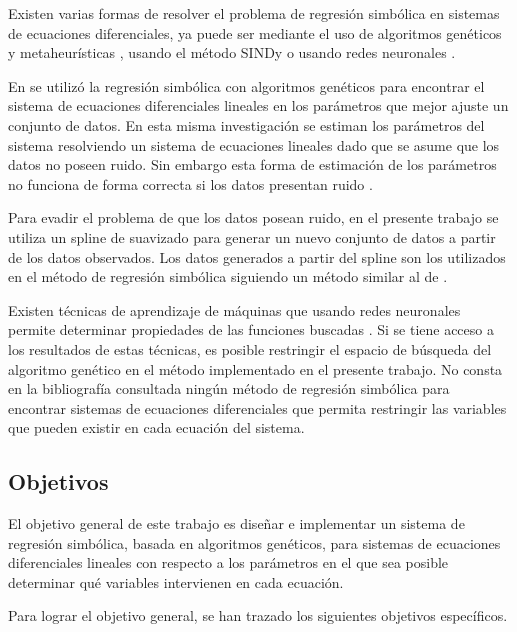 Existen varias formas de resolver el problema de regresión simbólica en sistemas de ecuaciones diferenciales, ya puede ser mediante el uso de algoritmos genéticos y metaheurísticas \cite{koza1994genetic, schmidt2013eureqa}, usando el método SINDy \cite{brunton2016discovering} o usando redes neuronales \cite{udrescu2020ai}.

En \cite{iba2008inference} se utilizó la regresión simbólica con algoritmos genéticos para encontrar el sistema de ecuaciones diferenciales lineales en los parámetros que mejor ajuste un conjunto de datos. En esta misma investigación se estiman los parámetros del sistema resolviendo un sistema de ecuaciones lineales dado que se asume que los datos no poseen ruido. Sin embargo esta forma de estimación de los parámetros no funciona de forma correcta si los datos presentan ruido \cite{essays2019ordinary}.

Para evadir el problema de que los datos posean ruido, en el presente trabajo se utiliza un spline de suavizado \cite{green1993nonparametric} para generar un nuevo conjunto de datos a partir de los datos observados. Los datos generados a partir del spline son los utilizados en el método de regresión simbólica siguiendo un método similar al de \cite{iba2008inference}.

Existen técnicas de aprendizaje de máquinas que usando redes neuronales permite determinar propiedades de las funciones buscadas \cite{udrescu2020ai}. Si se tiene acceso a los resultados de estas técnicas, es posible restringir el espacio de búsqueda del algoritmo genético en el método implementado en el presente trabajo. No consta en la bibliografía consultada ningún método de regresión simbólica para encontrar sistemas de ecuaciones diferenciales que permita restringir las variables que pueden existir en cada ecuación del sistema.


\subsection*{Objetivos}

El objetivo general de este trabajo es diseñar e implementar un sistema de regresión simbólica, basada en algoritmos genéticos, para sistemas de ecuaciones diferenciales lineales con respecto a los parámetros en el que sea posible determinar qué variables intervienen en cada ecuación.

Para lograr el objetivo general, se han trazado los siguientes objetivos específicos.

